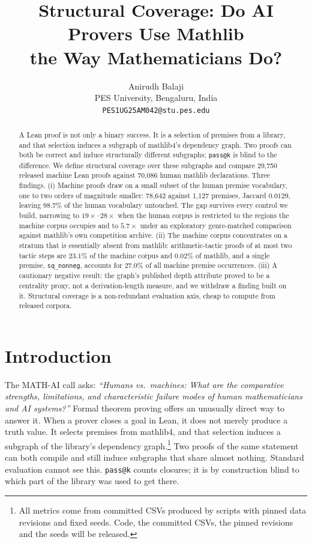 \documentclass{article}
\author{%
  Anirudh Balaji \\
  PES University, Bengaluru, India \\
  \texttt{PES1UG25AM042@stu.pes.edu} \\
}
\title{Structural Coverage: Do AI Provers Use Mathlib\\the Way Mathematicians Do?}
\begin{document}
\maketitle

\begin{abstract}
A Lean proof is not only a binary success. It is a selection of premises from a
library, and that selection induces a subgraph of mathlib4's dependency graph.
Two proofs can both be correct and induce structurally different subgraphs;
\texttt{pass@k} is blind to the difference. We define structural coverage over
these subgraphs and compare 29{,}750 released machine Lean proofs against
70{,}086 human mathlib declarations. Three findings. (i)
Machine proofs draw on a small subset of the human premise vocabulary, one to two
orders of magnitude smaller: 78{,}642 against 1{,}127 premises, Jaccard $0.0129$,
leaving $98.7\%$ of the human vocabulary untouched. The gap
survives every control we build, narrowing to $19\times$--$28\times$ when the
human corpus is restricted to the regions the machine corpus occupies and to
$5.7\times$ under an exploratory genre-matched comparison against mathlib's own
competition archive. (ii) The machine
corpus concentrates on a stratum that is essentially absent from mathlib:
arithmetic-tactic proofs of at most two tactic steps are $23.1\%$ of the machine
corpus and $0.02\%$ of mathlib, and a single premise, \texttt{sq\_nonneg},
accounts for $27.0\%$ of all machine premise occurrences. (iii) A cautionary
negative result: the graph's published depth attribute proved to be a centrality
proxy, not a derivation-length measure, and we withdraw a finding built on it.
Structural coverage is a non-redundant evaluation axis, cheap to compute from
released corpora.
\end{abstract}

\section{Introduction}

The MATH-AI call asks: \emph{``Humans vs.\ machines: What are the comparative
strengths, limitations, and characteristic failure modes of human mathematicians
and AI systems?''} Formal theorem proving offers an unusually direct way to
answer it. When a prover closes a goal in Lean, it does not merely produce a
truth value. It selects premises from mathlib4, and that selection induces a
subgraph of the library's dependency graph.\footnote{All metrics come from
committed CSVs produced by scripts with pinned data revisions and fixed seeds.
Code, the committed CSVs, the pinned revisions and the seeds will be released.}
Two proofs of the same statement can both compile and still induce subgraphs
that share almost nothing. Standard
evaluation cannot see this. \texttt{pass@k} counts closures; it is by
construction blind to which part of the library was used to get there.
\end{document}
